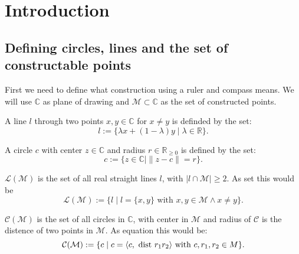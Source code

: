 \chapter{Introduction}

\section{Defining circles, lines and the set of constructable points}
First we need to define what construction using a ruler and compass means.
We will use $\mathbb{C}$ as plane of drawing and $\mathcal{M} \subset \mathbb{C}$ as the set of constructed points.

\begin{definition}[Line]
    \label{def:line}
    \leanok
    A line $l$ through two points $x,y\in\mathbb{C}$ for $x\ne y$ is definded by the set: $$l:=\{\lambda x+(1-\lambda)y\mid\lambda\in\mathbb{R}\}.$$
\end{definition}

\begin{definition}[Circle]
    \label{def:circle}
    \leanok
    A circle $c$ with center $z\in\mathbb{C}$ and radius $r\in\mathbb{R}_{\ge 0}$ is defined by the set: $$c:=\{z\in\mathbb{C} \mid\|z-c\|=r\}.$$
\end{definition}

\begin{definition}
    \label{def:set_of_lines}
    \leanok
    $\mathcal{L(M)}$ is the set of all real straight lines $l$, with $| l\cap \mathcal{M} |\ge 2$. As set this would be
    \begin{equation*}
        \mathcal{L(M)} := \{l \mid l = \{x,y\} \text{ with }x,y \in \mathcal{M} \land x \neq y\}.
    \end{equation*}
\end{definition}

\begin{definition}
    \label{def:set_of_circles}
    \leanok
    $\mathcal{C(M)}$ is the set of all circles in $\mathbb{C}$, with center in $\mathcal{M}$ and radius of $\mathcal{C}$ is the distence of two points in $\mathcal{M}$. As equation this would be:
    $$\mathcal{C(M)}:=\{c\mid c = \langle c, \text{ dist } r_1 r_2 \rangle \text{ with } c,r_1,r_2\in M\}.$$
\end{definition}

